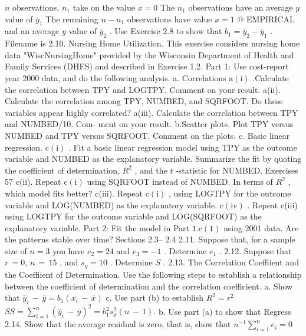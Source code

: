 \documentclass[11pt]{article}
\begin{document}
\(n\) observations, \(n_{1}\) take on the value \(x=0\) The \(n_{1}\) observations have an
 average \(y\) value of \(\overline{{y}}_{1}\) The remaining \(n-n_{1}\) observations have value \(x=1\)
@ EMPIRICAL and an average \(y\) value of \(\overline{{y}}_{2}\) . Use Exercise 2.8 to show that \(b_{1}=\overline{{y}}_{2}-\overline{{y}}_{1}\) .
Filename is 2.10. Nursing Home Utilization. This exercise considers nursing home data
"WiscNursingHome" provided by the Wisconsin Department of Health and Family Services
(DHFS) and described in Exercise 1.2.
 Part 1: Use cost-report year 2000 data, and do the following analysis.
a. Correlations
\(\mathrm{a ( i )}\) .Calculate the correlation between TPY and LOGTPY. Comment
on your result.
a(ii). Calculate the correlation among TPY, NUMBED, and
SQRFOOT. Do these variables appear highly correlated?
 a(iii). Calculate the correlation between TPY and NUMBED/10. Com-
ment on your result.
b.Scatter plots. Plot TPY versus NUMBED and TPY versus SQRFOOT.
Comment on the plots.
c. Basic linear regression.
\(\mathrm{c ( i )}\) . Fit a basic linear regression model using TPY as the outcome
variable and NUMBED as the explanatory variable. Summarize
the fit by quoting the coefficient of determination, \(R^{2}\) , and the
\(t\) -statistic for NUMBED.
 Exercises 57
c(ii). Repeat \(\mathrm{c ( i )}\) using SQRFOOT instead of NUMBED. In terms of
\(R^{2}\) , which model fits better?
c(iii). Repeat \(\mathrm{c ( i )}\) , using LOGTPY for the outcome variable and
LOG(NUMBED) as the explanatory variable.
\(\mathrm{c ( i v )}\) . Repeat c(iii) using LOGTPY for the outcome variable and
LOG(SQRFOOT) as the explanatory variable.
Part 2: Fit the model in Part \(\mathrm{1 . c} ( 1 )\) using 2001 data. Are the patterns
 stable over time?
Sections 2.3-- 2.4
2.11. Suppose that, for a sample size of \(n=3\) you have \(e_{2}=2 4\) and \(e_{3}=-1\) .
Determine \(e_{1}\) .
2.12. Suppose that \(r \,=0 , \, n \,=\, 1 5\) , and \(s_{y}=1 0\) . Determine \(\mathit{S}\) .
2.13. The Correlation Coeffiient and the Coeffiient of Determination. Use
the following steps to establish a relationship between the coefficient of
 determination and the correlation coefficient.
a. Show that \(\widehat{y}_{i} \,-\, \overline{{y}}=b_{1} ( x_{i} \,-\, \overline{{x}} )\)
c. Use part (b) to establish \(R^{2}=r^{2}\) \(S S=\sum_{i=1}^{n} \left( \widehat{y}_{i} \,-\, \overline{{y}} \right)^{2}=b_{1}^{2} s_{x}^{2} ( n \,-\, 1 ) .\)
b. Use part (a) to show that Regress
2.14. Show that the average residual is zero, that is, show that \(n^{-1} \sum_{i=1}^{n} e_{i}=0\)
\end{document}
